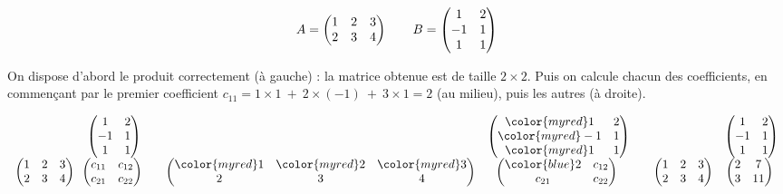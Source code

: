 \documentclass[11pt,class=report,crop=false]{standalone}
\begin{document}
\begin{exemple}
$$A =\begin{pmatrix}
1 & 2 & 3\cr
2 & 3 & 4\cr
\end{pmatrix}\qquad B =
\begin{pmatrix}
1&2\cr
-1&1 \cr
1&1\cr
\end{pmatrix}
$$


On dispose d'abord le produit correctement (à gauche) : la matrice obtenue
est de taille $2\times2$.
Puis on calcule chacun des coefficients,
en commençant par le premier coefficient $c_{11} = 1\times 1\ +\ 2\times(-1)\ +\ 3\times1=2$ (au milieu),
puis les autres (à droite).

$$\begin{array}{cc}
  &  \begin{pmatrix}
1&2\cr
-1&1 \cr
1&1\cr
\end{pmatrix} \\
\begin{pmatrix}
1 & 2 & 3\cr
2 & 3& 4\cr
\end{pmatrix}
   &\!\!
 \begin{pmatrix} c_{11} & c_{12} \\ c_{21} & c_{22} \end{pmatrix}
  \end{array}
   \quad
 \begin{array}{cc}
  & \begin{pmatrix}
{\color{myred}1}&2\cr
{\color{myred}-1}&1 \cr
{\color{myred}1}&1\cr
\end{pmatrix}  \\
\begin{pmatrix}
{\color{myred}1} & {\color{myred}2} & {\color{myred}3}\cr
2 & 3& 4\cr
\end{pmatrix}
   &\!\! \begin{pmatrix} {\color{blue}2} & c_{12} \\ c_{21} & c_{22} \end{pmatrix}
  \end{array}
  \quad
 \begin{array}{cc}
  &
\begin{pmatrix}
1&2\cr
-1&1 \cr
1&1\cr
\end{pmatrix}\\
\begin{pmatrix}
1 & 2 & 3\cr
2 & 3& 4\cr
\end{pmatrix}
   &\!\! \begin{pmatrix} 2 & 7 \cr 3 & 11 \end{pmatrix}
  \end{array}
 $$


\end{exemple}
\end{document}
